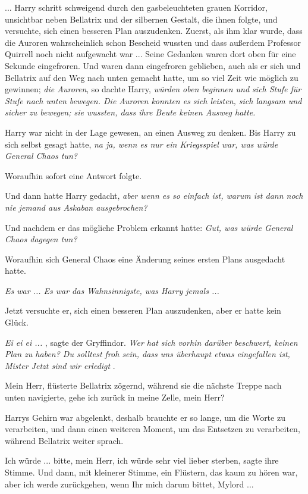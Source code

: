 ... Harry schritt schweigend durch den gasbeleuchteten grauen Korridor,
unsichtbar neben Bellatrix und der silbernen Gestalt, die ihnen folgte, und
versuchte, sich einen besseren Plan auszudenken. Zuerst, als ihm klar wurde,
dass die Auroren wahrscheinlich schon Bescheid wussten und dass außerdem
Professor Quirrell noch nicht aufgewacht war ... Seine Gedanken waren dort oben
für eine Sekunde eingefroren. Und waren dann eingefroren geblieben, auch als er
sich und Bellatrix auf den Weg nach unten gemacht hatte, um so viel Zeit wie
möglich zu gewinnen; \emph{die Auroren}, so dachte Harry, \emph{würden oben
beginnen und sich Stufe für Stufe nach unten bewegen. Die Auroren konnten es
sich leisten, sich langsam und sicher zu bewegen; sie wussten, dass ihre Beute
keinen Ausweg hatte.}

Harry war nicht in der Lage gewesen, an einen Ausweg zu denken. Bis Harry zu
sich selbst gesagt hatte, \emph{na ja, wenn es nur ein Kriegsspiel war, was
würde General Chaos tun?}

Woraufhin sofort eine Antwort folgte.

Und dann hatte Harry gedacht,\emph{ aber wenn es so einfach ist, warum ist dann
noch nie jemand aus Askaban ausgebrochen?}

Und nachdem er das mögliche Problem erkannt hatte: \emph{Gut, was würde General
Chaos dagegen tun?}

Woraufhin sich General Chaos eine Änderung seines ersten Plans ausgedacht hatte.

\emph{Es war ... Es war das Wahnsinnigste, was Harry jemals ...}

Jetzt versuchte er, sich einen besseren Plan auszudenken, aber er hatte kein
Glück.

\emph{\glqq{}Ei ei ei ...\grqq{}} , sagte der Gryffindor. \emph{Wer hat sich
vorhin darüber beschwert, keinen Plan zu haben? Du solltest froh sein, dass uns
überhaupt etwas eingefallen ist, Mister \glqq{}Jetzt sind wir erledigt\grqq{}} .

\glqq{}Mein Herr\grqq{}, flüsterte Bellatrix zögernd, während sie die nächste
Treppe nach unten navigierte, \glqq{}gehe ich zurück in meine Zelle, mein Herr?\grqq{}

Harrys Gehirn war abgelenkt, deshalb brauchte er so lange, um die Worte zu
verarbeiten, und dann einen weiteren Moment, um das Entsetzen zu verarbeiten,
während Bellatrix weiter sprach.

\glqq{}Ich würde ... bitte, mein Herr, ich würde sehr viel lieber sterben\grqq{},
sagte ihre Stimme. Und dann, mit kleinerer Stimme, ein Flüstern, das kaum zu
hören war, \glqq{}aber ich werde zurückgehen, wenn Ihr mich darum bittet,
Mylord ...\grqq{}

